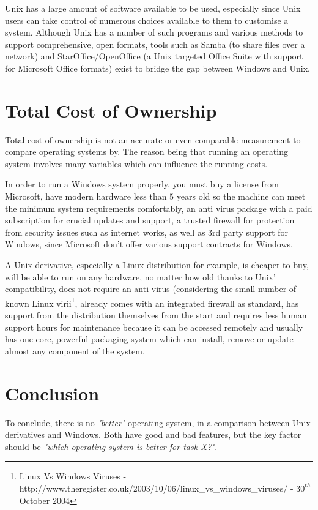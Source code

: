 \documentclass[a4paper,12pt]{article}
\begin{document}
Unix has a large amount of software available to be used, especially
since Unix users can take control of numerous choices available to them
to customise a system. Although Unix has a number of such programs and
various methods to support comprehensive, open formats, tools such as 
Samba (to share files over a network) and StarOffice/OpenOffice (a Unix
targeted Office Suite with support for Microsoft Office formats) exist
to bridge the gap between Windows and Unix.

\section*{Total Cost of Ownership}

Total cost of ownership is not an accurate or even comparable
measurement to compare operating systems by. The reason being that
running an operating system involves many variables which can influence
the running costs.

In order to run a Windows system properly, you must buy a license from
Microsoft, have modern hardware less than $5$ years old so the machine
can meet the minimum system requirements comfortably, an anti virus
package with a paid subscription for crucial updates and support, a
trusted firewall for protection from security issues such as internet
works, as well as 3rd party support for Windows, since Microsoft don't
offer various support contracts for Windows.

A Unix derivative, especially a Linux distribution for example, is
cheaper to buy, will be able to run on any hardware, no matter how old
thanks to Unix' compatibility, does not require an anti virus
(considering the small number of known Linux virii\footnote{Linux Vs
Windows Viruses -
http://www.theregister.co.uk/2003/10/06/linux\_vs\_windows\_viruses/ -
$30^{th}$ October $2004$}, already comes with an integrated firewall as
standard, has support from the distribution themselves from the start
and requires less human support hours for maintenance because it can be
accessed remotely and usually has one core, powerful  packaging system
which can install, remove or update almost any component of the system.

\section*{Conclusion}

To conclude, there is no \emph{"better"} operating system, in a
comparison between Unix derivatives and Windows. Both have good and bad
features, but the key factor should be \emph{"which operating system is 
better for task X?"}. 
\end{document}
